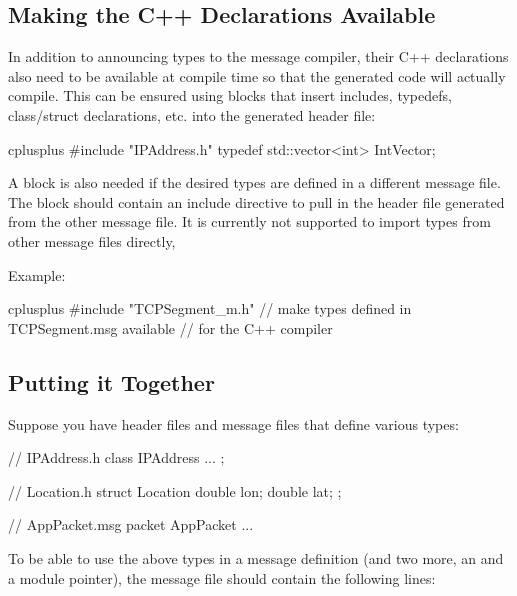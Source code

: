 \subsection{Making the C++ Declarations Available}
\label{sec:msg-def:making-cpp-declarations-available}

In addition to announcing types to the message compiler, their C++
declarations also need to be available at compile time so that the
generated code will actually compile. This can be ensured using
 blocks that insert includes, typedefs, class/struct
declarations, etc. into the generated header file:

\begin{msg}
cplusplus {{
#include "IPAddress.h"
typedef std::vector<int> IntVector;
}}
\end{msg}

A  block is also needed if the desired types are
defined in a different message file. The block should contain an include
directive to pull in the header file generated from the other message file.
It is currently not supported to import types from other message files
directly,

Example:

\begin{msg}
cplusplus {{
#include "TCPSegment_m.h"  // make types defined in TCPSegment.msg available
                           // for the C++ compiler
}}
\end{msg}


\subsection{Putting it Together}
\label{sec:msg-def:putting-it-together}

Suppose you have header files and message files that define various types:

\begin{cpp}
// IPAddress.h
class IPAddress {
   ...
};
\end{cpp}

\begin{cpp}
// Location.h
struct Location {
    double lon;
    double lat;
};
\end{cpp}

\begin{msg}
// AppPacket.msg
packet AppPacket {
   ...
}
\end{msg}

To be able to use the above types in a message definition (and two more,
an  and a module pointer), the message file should contain
the following lines:

